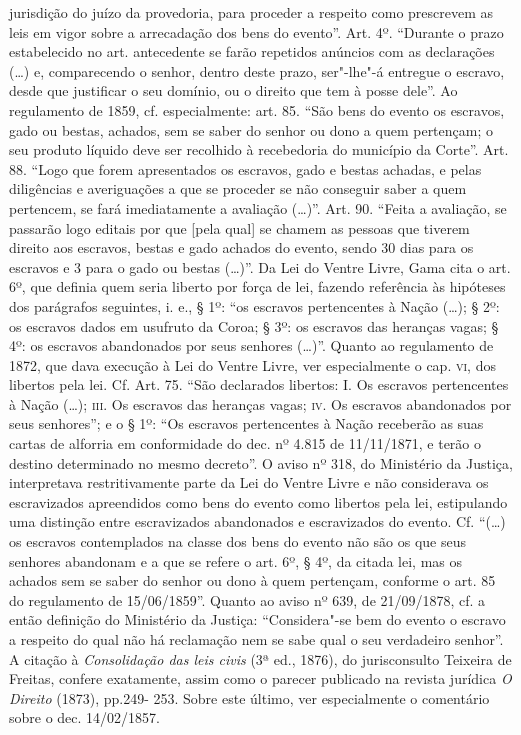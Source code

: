{  jurisdição do juízo da provedoria, para proceder a respeito como
  prescrevem as leis em vigor sobre a arrecadação dos bens do evento''.
  Art. 4º. ``Durante o prazo estabelecido no art. antecedente se farão
  repetidos anúncios com as declarações (\ldots{}) e, comparecendo o senhor,
  dentro deste prazo, ser"-lhe"-á entregue o escravo, desde que justificar
  o seu domínio, ou o direito que tem à posse dele''. Ao regulamento de
  1859, cf. especialmente: art. 85. ``São bens do evento os escravos,
  gado ou bestas, achados, sem se saber do senhor ou dono a quem
  pertençam; o seu produto líquido deve ser recolhido à recebedoria do
  município da Corte''. Art. 88. ``Logo que forem apresentados os escravos,
  gado e bestas achadas, e pelas diligências e averiguações a que se
  proceder se não conseguir saber a quem pertencem, se fará
  imediatamente a avaliação (\ldots{})''. Art. 90. ``Feita a avaliação, se
  passarão logo editais por que {[}pela qual{]} se chamem as pessoas que
  tiverem direito aos escravos, bestas e gado achados do evento, sendo
  30 dias para os escravos e 3 para o gado ou bestas (\ldots{})''. Da Lei do
  Ventre Livre, Gama cita o art. 6º, que definia quem seria liberto por
  força de lei, fazendo referência às hipóteses dos parágrafos
  seguintes, i. e., § 1º: ``os escravos pertencentes à Nação (\ldots{}); §
  2º: os escravos dados em usufruto da Coroa; § 3º: os escravos das
  heranças vagas; § 4º: os escravos abandonados por seus senhores
  (\ldots{})''. Quanto ao regulamento de 1872, que dava execução à Lei do
  Ventre Livre, ver especialmente o cap. \textsc{vi}, dos libertos pela lei. Cf.
  Art. 75. ``São declarados libertos: I. Os escravos pertencentes à Nação
  (\ldots{}); \textsc{iii}. Os escravos das heranças vagas; \textsc{iv}. Os escravos
  abandonados por seus senhores''; e o § 1º: ``Os escravos pertencentes à
  Nação receberão as suas cartas de alforria em conformidade do dec. nº
  4.815 de 11/11/1871, e terão o destino determinado no mesmo decreto''.
  O aviso nº 318, do Ministério da Justiça, interpretava restritivamente
  parte da Lei do Ventre Livre e não considerava os escravizados
  apreendidos como bens do evento como libertos pela lei, estipulando
  uma distinção entre escravizados abandonados e escravizados do evento.
  Cf. ``(\ldots{}) os escravos contemplados na classe dos bens do evento não
  são os que seus senhores abandonam e a que se refere o art. 6º, § 4º,
  da citada lei, mas os achados sem se saber do senhor ou dono à quem
  pertençam, conforme o art. 85 do regulamento de 15/06/1859''. Quanto ao
  aviso nº 639, de 21/09/1878, cf. a então definição do Ministério da
  Justiça: ``Considera"-se bem do evento o escravo a respeito do qual não
  há reclamação nem se sabe qual o seu verdadeiro senhor''. A citação à
  \emph{Consolidação das leis civis} (3ª ed., 1876), do jurisconsulto
  Teixeira de Freitas, confere exatamente, assim como o parecer
  publicado na revista jurídica \emph{O Direito} (1873), pp.249- 253.
  Sobre este último, ver especialmente o comentário sobre o dec.
  14/02/1857.}

